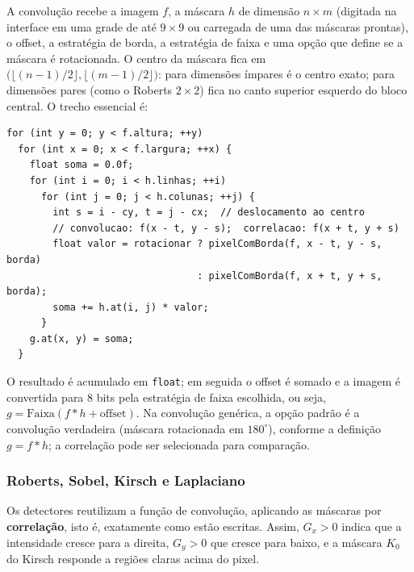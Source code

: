 \documentclass[11pt,a4paper]{article}
\begin{document}
A convolução recebe a imagem $f$, a máscara $h$ de dimensão $n \times m$ (digitada na
interface em uma grade de até $9 \times 9$ ou carregada de uma das máscaras prontas), o
offset, a estratégia de borda, a estratégia de faixa e uma opção que define se a máscara é
rotacionada. O centro da máscara fica em $\big(\lfloor (n-1)/2 \rfloor,
\lfloor (m-1)/2 \rfloor\big)$: para dimensões ímpares é o centro exato; para dimensões pares
(como o Roberts $2 \times 2$) fica no canto superior esquerdo do bloco central. O trecho
essencial é:

\begin{verbatim}
for (int y = 0; y < f.altura; ++y)
  for (int x = 0; x < f.largura; ++x) {
    float soma = 0.0f;
    for (int i = 0; i < h.linhas; ++i)
      for (int j = 0; j < h.colunas; ++j) {
        int s = i - cy, t = j - cx;  // deslocamento ao centro
        // convolucao: f(x - t, y - s);  correlacao: f(x + t, y + s)
        float valor = rotacionar ? pixelComBorda(f, x - t, y - s, borda)
                                 : pixelComBorda(f, x + t, y + s, borda);
        soma += h.at(i, j) * valor;
      }
    g.at(x, y) = soma;
  }
\end{verbatim}

O resultado é acumulado em \texttt{float}; em seguida o offset é somado e a imagem é
convertida para 8 bits pela estratégia de faixa escolhida, ou seja,
$g = \mathrm{Faixa}(f * h + \text{offset})$. Na convolução genérica, a opção padrão é a
convolução verdadeira (máscara rotacionada em $180^\circ$), conforme a definição
$g = f * h$; a correlação pode ser selecionada para comparação.

\subsubsection{Roberts, Sobel, Kirsch e Laplaciano}

Os detectores reutilizam a função de convolução, aplicando as máscaras por
\textbf{correlação}, isto é, exatamente como estão escritas. Assim, $G_x > 0$ indica que a
intensidade cresce para a direita, $G_y > 0$ que cresce para baixo, e a máscara $K_0$ do
Kirsch responde a regiões claras acima do pixel.
\end{document}
